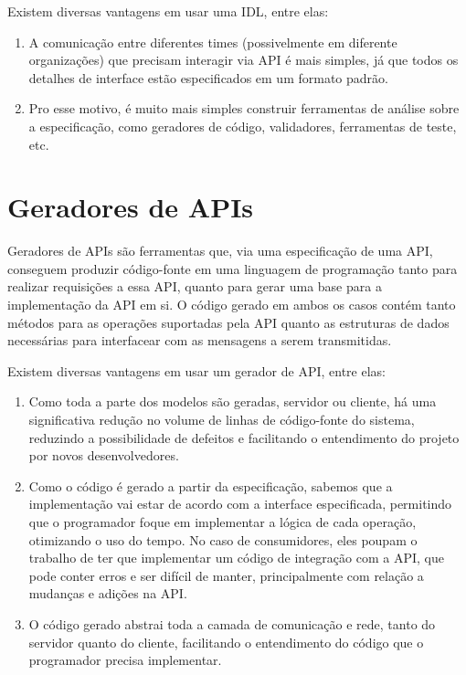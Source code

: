 Existem diversas vantagens em usar uma IDL, entre elas:

\begin{enumerate}
\item
  A comunicação entre diferentes times (possivelmente em diferente organizações) que
  precisam interagir via API é mais simples, já que todos os detalhes de interface
  estão especificados em um formato padrão.
\item
  Pro esse motivo, é muito mais simples construir ferramentas de análise sobre a
  especificação, como geradores de código, validadores, ferramentas de teste, etc.
\end{enumerate}

\section{Geradores de APIs}

Geradores de APIs são ferramentas que, via uma especificação de uma API, conseguem
produzir código-fonte em uma linguagem de programação tanto para realizar requisições
a essa API, quanto para gerar uma base para a implementação da API em si.
O código gerado em ambos os casos contém tanto métodos para as operações suportadas
pela API quanto as estruturas de dados necessárias para interfacear com as mensagens
a serem transmitidas.

Existem diversas vantagens em usar um gerador de API, entre elas:

\begin{enumerate}
\item
  Como toda a parte dos modelos são geradas, servidor ou cliente, há uma significativa
  redução no volume de linhas de código-fonte do sistema, reduzindo a possibilidade
  de defeitos \cite{5010260} e facilitando o entendimento do projeto por novos
  desenvolvedores.
\item
  Como o código é gerado a partir da especificação, sabemos que a implementação
  vai estar de acordo com a interface especificada, permitindo que o programador
  foque em implementar a lógica de cada operação, otimizando o uso do tempo. No
  caso de consumidores, eles poupam o trabalho de ter que implementar um código
  de integração com a API, que pode conter erros e ser difícil de manter,
  principalmente com relação a mudanças e adições na API.
\item
  O código gerado abstrai toda a camada de comunicação e rede, tanto do servidor
  quanto do cliente, facilitando o entendimento do código que o programador precisa
  implementar.
\end{enumerate}

